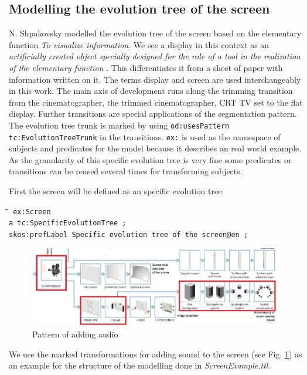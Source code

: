\documentclass[11pt,a4paper]{article}
\newenvironment{code}{\tt \begin{tabbing}
\hskip12pt\=\hskip12pt\=\hskip12pt\=\hskip12pt\=\hskip5cm\=\hskip5cm\=\kill}
{\end{tabbing}}
\def\dq{{\char34}}
\begin{document}
\subsection{Modelling the evolution tree of the screen}

N. Shpakovsky modelled the evolution tree of the screen based on the
elementary function \textit{To visualize information}. We see a display in
this context as an \textit{artificially created object specially designed for
  the role of a tool in the realization of the elementary function}
\cite{Shpakovsky2016}. This differentiates it from a sheet of paper with
information written on it. The terms display and screen are used
interchangeably in this work. The main axis of development runs along the
trimming transition from the cinematographer, the trimmed cinematographer, CRT
TV set to the flat display. Further transitions are special applications of
the segmentation pattern. The evolution tree trunk is marked by using
\texttt{od:usesPattern tc:EvolutionTreeTrunk} in the transitions. \texttt{ex:}
is used as the namespace of subjects and predicates for the model because it
describes an real world example. As the granularity of this specific evolution
tree is very fine some predicates or transitions can be reused several times
for transforming subjects.

First the screen will be defined as an specific evolution tree:
\begin{code}\tt
ex:Screen \\
\> a tc:SpecificEvolutionTree ; \\
\>\> skos:prefLabel {\dq}Specific evolution tree of the screen{\dq}@en ;
\end{code}

\begin{figure}[htb]
  \centering
  \includegraphics[width=.9\linewidth]{figures/audio.png}
  \caption{\small Pattern of adding audio \cite{Shpakovsky2016}}
  \label{fig:audio}
\end{figure}

We use the marked transformations for adding sound to the screen (see
Fig. \ref{fig:audio}) as an example for the structure of the modelling done in
\textit{ScreenExample.ttl}.
\end{document}
